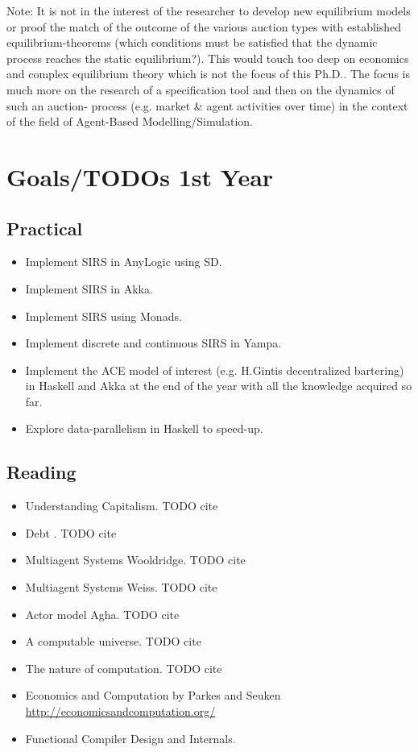 \documentclass{article}
\begin{document}
{\tiny Note: It is not in the interest of the researcher to develop new equilibrium models or proof the match of the outcome of the various auction types with established equilibrium-theorems (which conditions must be satisfied that the dynamic process reaches the static equilibrium?). This would touch too deep on economics and complex equilibrium theory which is not the focus of this Ph.D.. The focus is much more on the research of a specification tool and then on the dynamics of such an auction- process (e.g. market \& agent activities over time) in the context of the field of Agent-Based Modelling/Simulation.}

\pagebreak

\section{Goals/TODOs 1st Year}
\subsection{Practical}
\begin{itemize}
\item Implement SIRS in AnyLogic using SD.
\item Implement SIRS in Akka.
\item Implement SIRS using Monads.
\item Implement discrete and continuous SIRS in Yampa.
\item Implement the ACE model of interest (e.g. H.Gintis decentralized bartering) in Haskell and Akka at the end of the year with all the knowledge acquired so far.
\item Explore data-parallelism in Haskell to speed-up.
\end{itemize}

\subsection{Reading}
\begin{itemize}
\item Understanding Capitalism. TODO cite
\item Debt . TODO cite
\item Multiagent Systems Wooldridge. TODO cite
\item Multiagent Systems Weiss. TODO cite
\item Actor model Agha. TODO cite
\item A computable universe. TODO cite
\item The nature of computation. TODO cite
\item Economics and Computation by Parkes and Seuken \url{http://economicsandcomputation.org/}
\item Functional Compiler Design and Internals.
\end{itemize}
\end{document}
